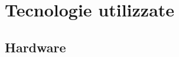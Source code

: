 \documentclass[12pt,a4paper,openright,twoside]{book}
\begin{document}





\chapter{Tecnologie utilizzate}




\section{Hardware}
\end{document}
